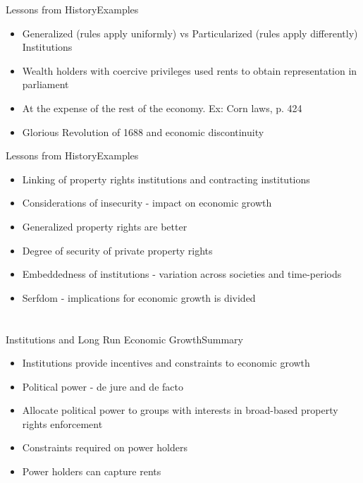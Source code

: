 \documentclass{beamer}
\begin{document}
\begin{frame}{Lessons from History}{Examples}
\begin{itemize}
\item{Generalized (rules apply uniformly) vs Particularized (rules apply differently) Institutions}
\item{Wealth holders with coercive privileges used rents to obtain representation in parliament}
\item{At the expense of the rest of the economy. Ex: Corn laws, p. 424}
\item{Glorious Revolution of 1688 and economic discontinuity}
\end{itemize}
\end{frame}

\begin{frame}{Lessons from History}{Examples}
\begin{itemize}
\item{Linking of property rights institutions and contracting institutions}
\item{Considerations of insecurity - impact on economic growth}
\item{Generalized property rights are better}
\item{Degree of security of private property rights}
\item{Embeddedness of institutions - variation across societies and time-periods}
\item{Serfdom - implications for economic growth is divided}
\end{itemize}
\end{frame}

\section{\cite{Acemoglu2005}}
\begin{frame}{Institutions and Long Run Economic Growth}{Summary}
\begin{itemize}
\item{Institutions provide incentives and constraints to economic growth}
\item{Political power - de jure and de facto}
\item{Allocate political power to groups with interests in broad-based property rights enforcement}
\item{Constraints required on power holders}
\item{Power holders can capture rents}
\end{itemize}
\end{frame}
\end{document}
